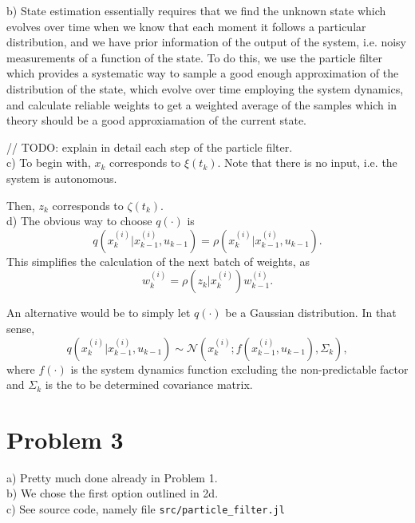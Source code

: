 \documentclass[12pt]{article}
\begin{document}
b) State estimation essentially requires that we find the unknown state which evolves over time when we know that each moment it follows a particular distribution, and we have prior information of the output of the system, i.e. noisy measurements of a function of the state. To do this, we use the particle filter which provides a systematic way to sample a good enough approximation of the distribution of the state, which evolve over time employing the system dynamics, and calculate reliable weights to get a weighted average of the samples which in theory should be a good approxiamation of the current state. 

// TODO: explain in detail each step of the particle filter. \\

c) To begin with, \(x_k \) corresponds to \(\xi(t_k) \). Note that there is no input, i.e. the system is autonomous. 

Then, \(z_k \) corresponds to \(\zeta(t_k )\). \\

d) The obvious way to choose \(q(\cdot )\) is 
\begin{equation*}
    q(x_k^{(i)}|x_{k-1}^{(i)}, u_{k-1}) = \rho(x_k^{(i)}|x_{k-1}^{(i)}, u_{k-1}). 
\end{equation*}
This simplifies the calculation of the next batch of weights, as 
\begin{equation*}
    w_k^{(i)} = \rho(z_k|x_k^{(i)})w_{k-1}^{(i)}. 
\end{equation*}

An alternative would be to simply let \(q(\cdot )\) be a Gaussian distribution. In that sense, 
\begin{equation*}
    q(x_k^{(i)}|x_{k-1}^{(i)}, u_{k-1}) \sim \mathcal{N}(x_k^{(i)}; f(x_{k-1}^{(i)}, u_{k-1}), \Sigma_k), 
\end{equation*}
where \(f(\cdot )\) is the system dynamics function excluding the non-predictable factor and \(\Sigma_k \) is the to be determined covariance matrix. 

\section*{Problem 3}
a) Pretty much done already in Problem 1. \\

b) We chose the first option outlined in 2d. \\

c) See source code, namely file \texttt{src/particle\_filter.jl} \\
\end{document}
